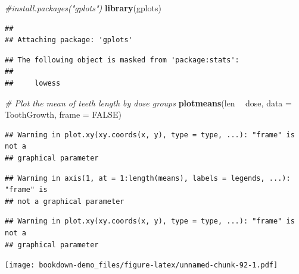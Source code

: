 \documentclass[]{book}
\newenvironment{Shaded}{\begin{snugshade}}{\end{snugshade}}
\newcommand{\KeywordTok}[1]{\textcolor[rgb]{0.13,0.29,0.53}{\textbf{#1}}}
\newcommand{\DataTypeTok}[1]{\textcolor[rgb]{0.13,0.29,0.53}{#1}}
\newcommand{\StringTok}[1]{\textcolor[rgb]{0.31,0.60,0.02}{#1}}
\newcommand{\CommentTok}[1]{\textcolor[rgb]{0.56,0.35,0.01}{\textit{#1}}}
\newcommand{\OtherTok}[1]{\textcolor[rgb]{0.56,0.35,0.01}{#1}}
\newcommand{\OperatorTok}[1]{\textcolor[rgb]{0.81,0.36,0.00}{\textbf{#1}}}
\newcommand{\NormalTok}[1]{#1}
\begin{document}
\begin{Shaded}
\begin{Highlighting}[]
\CommentTok{#install.packages("gplots")}
\KeywordTok{library}\NormalTok{(gplots)}
\end{Highlighting}
\end{Shaded}

\begin{verbatim}
## 
## Attaching package: 'gplots'
\end{verbatim}

\begin{verbatim}
## The following object is masked from 'package:stats':
## 
##     lowess
\end{verbatim}

\begin{Shaded}
\begin{Highlighting}[]
\CommentTok{# Plot the mean of teeth length by dose groups}
\KeywordTok{plotmeans}\NormalTok{(len }\OperatorTok{~}\StringTok{ }\NormalTok{dose, }\DataTypeTok{data =}\NormalTok{ ToothGrowth, }\DataTypeTok{frame =} \OtherTok{FALSE}\NormalTok{)}
\end{Highlighting}
\end{Shaded}

\begin{verbatim}
## Warning in plot.xy(xy.coords(x, y), type = type, ...): "frame" is not a
## graphical parameter
\end{verbatim}

\begin{verbatim}
## Warning in axis(1, at = 1:length(means), labels = legends, ...): "frame" is
## not a graphical parameter
\end{verbatim}

\begin{verbatim}
## Warning in plot.xy(xy.coords(x, y), type = type, ...): "frame" is not a
## graphical parameter
\end{verbatim}

\texttt{[image: bookdown-demo\_files/figure-latex/unnamed-chunk-92-1.pdf]}


\end{document}
